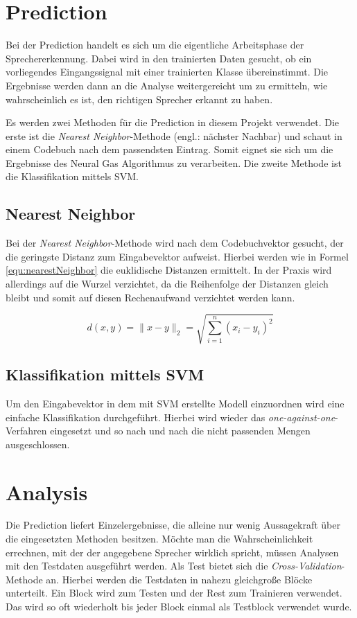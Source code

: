 \section{Prediction}
Bei der Prediction handelt es sich um die eigentliche Arbeitsphase der Sprechererkennung. Dabei wird in den trainierten Daten gesucht, ob ein vorliegendes Eingangssignal mit einer trainierten Klasse übereinstimmt. Die Ergebnisse werden dann an die Analyse weitergereicht um zu ermitteln, wie wahrscheinlich es ist, den richtigen Sprecher erkannt zu haben.

Es werden zwei Methoden für die Prediction in diesem Projekt verwendet. Die erste ist die \emph{Nearest Neighbor}-Methode (engl.: nächster Nachbar) und schaut in einem Codebuch nach dem passendsten Eintrag. Somit eignet sie sich um die Ergebnisse des Neural Gas Algorithmus zu verarbeiten. Die zweite Methode ist die Klassifikation mittels SVM.

\subsection{Nearest Neighbor}
Bei der \emph{Nearest Neighbor}-Methode wird nach dem Codebuchvektor gesucht, der die geringste Distanz zum Eingabevektor aufweist. Hierbei werden wie in Formel \ref{equ:nearestNeighbor} die euklidische Distanzen ermittelt. In der Praxis wird allerdings auf die Wurzel verzichtet, da die Reihenfolge der Distanzen gleich bleibt und somit auf diesen Rechenaufwand verzichtet werden kann.

\begin{equation}
	\label{equ:nearestNeighbor}
	d(x,y) = \|x-y\|_2 = \sqrt{\sum_{i=1}^n (x_i-y_i)^2}
\end{equation}

\subsection{Klassifikation mittels SVM}
Um den Eingabevektor in dem mit SVM erstellte Modell einzuordnen wird eine einfache Klassifikation durchgeführt. Hierbei wird wieder das \emph{one-against-one}-Verfahren eingesetzt und so nach und nach die nicht passenden Mengen ausgeschlossen.

\section{Analysis}
Die Prediction liefert Einzelergebnisse, die alleine nur wenig Aussagekraft über die eingesetzten Methoden besitzen. Möchte man die Wahrscheinlichkeit errechnen, mit der der angegebene Sprecher wirklich spricht, müssen Analysen mit den Testdaten ausgeführt werden. Als Test bietet sich die \emph{Cross-Validation}-Methode an. Hierbei werden die Testdaten in nahezu gleichgroße Blöcke unterteilt. Ein Block wird zum Testen und der Rest zum Trainieren verwendet. Das wird so oft wiederholt bis jeder Block einmal als Testblock verwendet wurde. 

